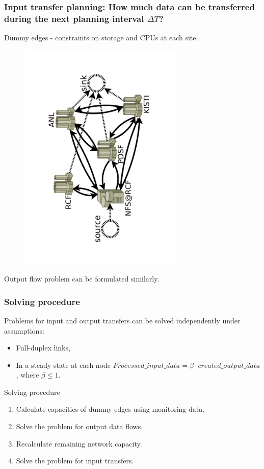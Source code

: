 \documentclass{beamer}
\begin{document}
\begin{frame}\frametitle{Input transfer planning: How much data can be transferred during the next planning interval $\Delta T$?}
Dummy edges - constraints on  storage and CPUs at each site.
\begin{figure}[h]
	\begin{center}
		\includegraphics [trim= 30mm 30mm 30mm 30mm , clip, angle =-90, width=0.7\textwidth]{pic/real_network.pdf}
	\end{center}
	\label{real_network}
\end{figure} 
\vspace{-3mm}
Output flow problem can be formulated similarly.
\end{frame}

\begin{frame}\frametitle{Solving procedure}
\begin{block}{}
Problems for input and output transfers can be solved independently under assumptions: 
\begin{itemize}
\item Full-duplex links,
\item In a steady state at each node $Processed\_input\_data= \beta \cdot created\_output\_data$, where $\beta \leq 1$.
\end{itemize}
\end{block} 

\begin{block}{Solving procedure}
\begin{enumerate}
\item Calculate capacities of dummy edges using monitoring data.
\item Solve the problem for output data flows.
\item Recalculate remaining network capacity.
\item Solve the problem for input transfers.
\end{enumerate}
\end{block}    
\end{frame}
\end{document}
